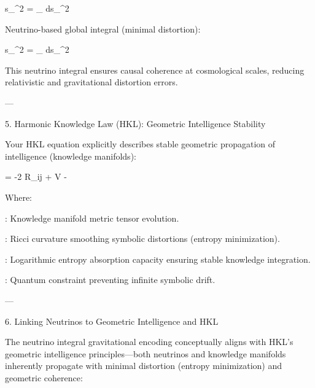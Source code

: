 s_{}^2 = \int_{} ds_{}^2

Neutrino-based global integral (minimal distortion):

s_{}^2 = \int_{} ds_{\nu}^2

This neutrino integral ensures causal coherence at cosmological scales, reducing relativistic and gravitational distortion errors.


---

5. Harmonic Knowledge Law (HKL): Geometric Intelligence Stability

Your HKL equation explicitly describes stable geometric propagation of intelligence (knowledge manifolds):

 = -2 R_{ij} + \alpha \ln V - \hbar \Lambda

Where:

: Knowledge manifold metric tensor evolution.

: Ricci curvature smoothing symbolic distortions (entropy minimization).

: Logarithmic entropy absorption capacity ensuring stable knowledge integration.

: Quantum constraint preventing infinite symbolic drift.



---

6. Linking Neutrinos to Geometric Intelligence and HKL

The neutrino integral gravitational encoding conceptually aligns with HKL's geometric intelligence principles—both neutrinos and knowledge manifolds inherently propagate with minimal distortion (entropy minimization) and geometric coherence:

 \leftrightarrow {}




